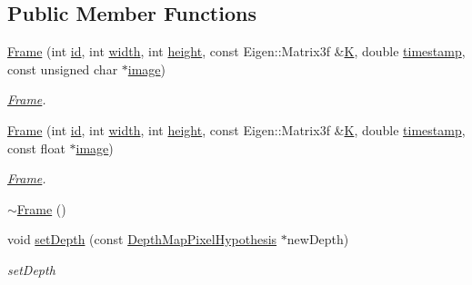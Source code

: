 \subsection*{Public Member Functions}
\begin{DoxyCompactItemize}
\item 
\hyperlink{classlsd__slam_1_1_frame_afe0e4c4a37577da20ae9ddd5a854f29d}{Frame} (int \hyperlink{classlsd__slam_1_1_frame_a6d38d40cd9a68d253bcb3cab2ddfa068}{id}, int \hyperlink{classlsd__slam_1_1_frame_a3f14a1c43b6cb21d31274f880b0bf36b}{width}, int \hyperlink{classlsd__slam_1_1_frame_a014d19bf6ffba0f0c0b8b684f9afb0b0}{height}, const Eigen\-::\-Matrix3f \&\hyperlink{classlsd__slam_1_1_frame_adeb235dc3e4a4d8fcf622b5771299c31}{K}, double \hyperlink{classlsd__slam_1_1_frame_a7124f3e1da6e9db387a3f89706225b47}{timestamp}, const unsigned char $\ast$\hyperlink{classlsd__slam_1_1_frame_a9306307027bbe62b973c0b138216b456}{image})
\begin{DoxyCompactList}\small\item\em \hyperlink{classlsd__slam_1_1_frame}{Frame}. \end{DoxyCompactList}\item 
\hyperlink{classlsd__slam_1_1_frame_aeefefa841f84ffa5a2a9a31c5eefe9c0}{Frame} (int \hyperlink{classlsd__slam_1_1_frame_a6d38d40cd9a68d253bcb3cab2ddfa068}{id}, int \hyperlink{classlsd__slam_1_1_frame_a3f14a1c43b6cb21d31274f880b0bf36b}{width}, int \hyperlink{classlsd__slam_1_1_frame_a014d19bf6ffba0f0c0b8b684f9afb0b0}{height}, const Eigen\-::\-Matrix3f \&\hyperlink{classlsd__slam_1_1_frame_adeb235dc3e4a4d8fcf622b5771299c31}{K}, double \hyperlink{classlsd__slam_1_1_frame_a7124f3e1da6e9db387a3f89706225b47}{timestamp}, const float $\ast$\hyperlink{classlsd__slam_1_1_frame_a9306307027bbe62b973c0b138216b456}{image})
\begin{DoxyCompactList}\small\item\em \hyperlink{classlsd__slam_1_1_frame}{Frame}. \end{DoxyCompactList}\item 
\hyperlink{classlsd__slam_1_1_frame_a243e3f54a3c45619b99beab2411ed354}{$\sim$\-Frame} ()
\item 
void \hyperlink{classlsd__slam_1_1_frame_aa869fc645781090678dc61399ef26f73}{set\-Depth} (const \hyperlink{classlsd__slam_1_1_depth_map_pixel_hypothesis}{Depth\-Map\-Pixel\-Hypothesis} $\ast$new\-Depth)
\begin{DoxyCompactList}\small\item\em set\-Depth \end{DoxyCompactList}\item 

\end{DoxyCompactItemize}
